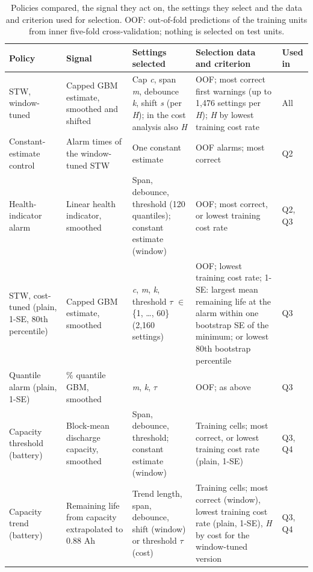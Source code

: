 \documentclass[a4paper,fleqn,doubleblind]{cas-dc}
\begin{document}
\begin{table}[!tbp]
\footnotesize\setlength{\tabcolsep}{4pt}
\caption{Policies compared, the signal they act on, the settings they select and the data and criterion used for selection. OOF: out-of-fold predictions of the training units from inner five-fold cross-validation; nothing is selected on test units.}
\begin{tabular}{@{}>{\raggedright\arraybackslash}p{}>{\raggedright\arraybackslash}p{}>{\raggedright\arraybackslash}p{}>{\raggedright\arraybackslash}p{}>{\raggedright\arraybackslash}p{}@{}}
\toprule
Policy & Signal & Settings selected & Selection data and criterion & Used in \\
\midrule
STW, window-tuned & Capped GBM estimate, smoothed and shifted & Cap \textit{c}, span \textit{m}, debounce \textit{k}, shift \textit{s} (per \textit{H}); in the cost analysis also \textit{H} & OOF; most correct first warnings (up to 1,476 settings per \textit{H}); \textit{H} by lowest training cost rate & All \\
Constant-estimate control & Alarm times of the window-tuned STW & One constant estimate & OOF alarms; most correct & Q2 \\
Health-indicator alarm & Linear health indicator, smoothed & Span, debounce, threshold (120 quantiles); constant estimate (window)  & OOF; most correct, or lowest training cost rate & Q2, Q3 \\
STW, cost-tuned (plain, 1-SE, 80th percentile) & Capped GBM estimate, smoothed & \textit{c}, \textit{m}, \textit{k}, threshold $\tau$ $\in$ \{1, \ldots{}, 60\} (2,160 settings) & OOF; lowest training cost rate; 1-SE: largest mean remaining life at the alarm within one bootstrap SE of the minimum; or lowest 80th bootstrap percentile & Q3 \\
Quantile alarm (plain, 1-SE) & 10\% quantile GBM, smoothed & \textit{m}, \textit{k}, $\tau$ & OOF; as above & Q3 \\
Capacity threshold (battery) & Block-mean discharge capacity, smoothed & Span, debounce, threshold; constant estimate (window) & Training cells; most correct, or lowest training cost rate (plain, 1-SE) & Q3, Q4 \\
Capacity trend (battery) & Remaining life from capacity extrapolated to 0.88 Ah & Trend length, span, debounce, shift (window) or threshold $\tau$ (cost) & Training cells; most correct (window), lowest training cost rate (plain, 1-SE), \textit{H} by cost for the window-tuned version & Q3, Q4 \\

\end{tabular}
\end{table}
\end{document}
